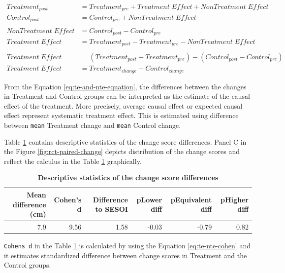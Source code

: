 \documentclass[
]{book}
\begin{document}
\begin{equation}
  \begin{split}
    Treatment_{post} &= Treatment_{pre} + Treatment \; Effect + NonTreatment \; Effect \\
    Control_{post} &= Control_{pre} + NonTreatment \; Effect \\
\\
    NonTreatment \; Effect &= Control_{post} - Control_{pre} \\
    Treatment \; Effect &= Treatment_{post} - Treatment_{pre} - NonTreatment \; Effect \\
\\
    Treatment \; Effect &= (Treatment_{post} - Treatment_{pre}) - (Control_{post} - Control_{pre}) \\
    Treatment \; Effect &= Treatment_{change} - Control_{change}
  \end{split}
  \label{eq:te-and-nte-equation}
\end{equation}

From the Equation \eqref{eq:te-and-nte-equation}, the differences between the changes in Treatment and Control groups can be interpreted as the estimate of the causal effect of the treatment. More precisely, average causal effect or expected causal effect represent systematic treatment effect. This is estimated using difference between \texttt{mean} Treatment change and \texttt{mean} Control change.

Table \ref{tab:rct-te-estimates} contains descriptive statistics of the change score differences. Panel C in the Figure \ref{fig:rct-paired-change} depicts distribution of the change scores and reflect the calculus in the Table \ref{tab:rct-te-estimates} graphically.



\begin{table}

\caption{\label{tab:rct-te-estimates}\textbf{Descriptive statistics of the change score differences}}
\centering
\begin{tabular}[t]{rrrrrr}
\toprule
Mean difference (cm) & Cohen's d & Difference to SESOI & pLower diff & pEquivalent diff & pHigher diff\\
\midrule
7.9 & 9.56 & 1.58 & -0.03 & -0.79 & 0.82\\
\bottomrule
\end{tabular}
\end{table}

\texttt{Cohen\textquotesingle{}s\ d} in the Table \ref{tab:rct-te-estimates} is calculated by using the Equation \eqref{eq:te-nte-cohen} and it estimates standardized difference between change scores in Treatment and the Control groups.
\end{document}
